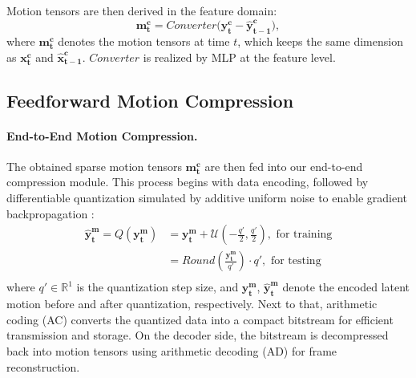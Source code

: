 \documentclass[letterpaper]{article} %
\begin{document}
Motion tensors are then derived in the feature domain: 
\begin{equation}
    \boldsymbol{m^c_{t}}   = Converter (\boldsymbol{y^c_{t}} - \boldsymbol{\hat{y}^c_{t-1})},
\end{equation}
where $\boldsymbol{m^c_{t}}$ denotes the motion tensors at time $t$, which keeps the same dimension as $\boldsymbol{x^c_t}$ and $\boldsymbol{\hat{x}^c_{t-1}}$. $Converter$ is realized by MLP at the feature level.

\subsection{Feedforward Motion Compression}
\label{sec:motion_compression}


\paragraph{\textbf{End-to-End Motion Compression.}}
The obtained sparse motion tensors $\boldsymbol{m^c_{t}}$ are then fed into our end-to-end compression module. This process begins with data encoding, followed by differentiable quantization simulated by additive uniform noise \cite{balle2016end} to enable gradient backpropagation :
\begin{equation}
    \begin{aligned}
    \boldsymbol{\hat{y}^m_t} =Q(\boldsymbol{y^m_t}) 
    & = \boldsymbol{y^m_t} + \mathcal{U}(-\frac{q'}{2}, \frac{q'}{2}),  \text{ for training} \\
    & = Round(\frac{\boldsymbol{y^m_t}}{q'}) \cdot q', \text{ for testing} \\
    \end{aligned}
\end{equation}
where $q'\in \mathbb{R}^1$ is the quantization step size, and $\boldsymbol{y^m_t}$, $\boldsymbol{\hat{y}^m_t}$ denote the encoded latent motion before and after quantization, respectively. Next to that, arithmetic coding (AC) converts the quantized data into a compact bitstream for efficient transmission and storage. On the decoder side, the bitstream is decompressed back into motion tensors using arithmetic decoding (AD) for frame reconstruction.
\end{document}
